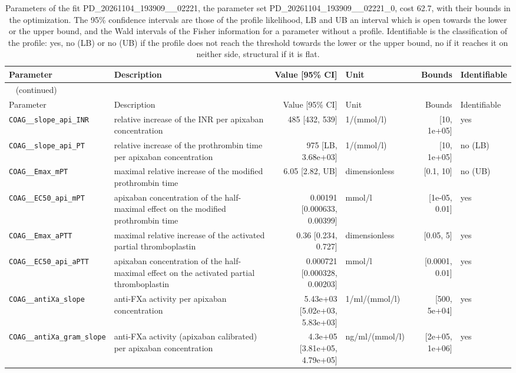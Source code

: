 \documentclass{article}
\begin{document}
\begin{longtable}{llrlrl}
\caption{Parameters of the fit PD\_20261104\_193909\_\_02221, the parameter set PD\_20261104\_193909\_\_02221\_0, cost 62.7, with their bounds in the optimization. The 95\% confidence intervals are those of the profile likelihood, LB and UB an interval which is open towards the lower or the upper bound, and the Wald intervals of the Fisher information for a parameter without a profile. Identifiable is the classification of the profile: yes, no (LB) or no (UB) if the profile does not reach the threshold towards the lower or the upper bound, no if it reaches it on neither side, structural if it is flat.}\label{tab:parameters:PD_20261104_193909__02221} \\
\toprule
Parameter & Description & Value [95\% CI] & Unit & Bounds & Identifiable \\
\midrule
\endfirsthead
\multicolumn{6}{l}{\small\tablename~\thetable{} (continued)} \\
\toprule
Parameter & Description & Value [95\% CI] & Unit & Bounds & Identifiable \\
\midrule
\endhead
\bottomrule
\endlastfoot
\texttt{COAG\_\_slope\_api\_INR} & relative increase of the INR per apixaban concentration & 485 [432, 539] & 1/(mmol/l) & [10, 1e+05] & yes \\
\texttt{COAG\_\_slope\_api\_PT} & relative increase of the prothrombin time per apixaban concentration & 975 [LB, 3.68e+03] & 1/(mmol/l) & [10, 1e+05] & no (LB) \\
\texttt{COAG\_\_Emax\_mPT} & maximal relative increase of the modified prothrombin time & 6.05 [2.82, UB] & dimensionless & [0.1, 10] & no (UB) \\
\texttt{COAG\_\_EC50\_api\_mPT} & apixaban concentration of the half-maximal effect on the modified prothrombin time & 0.00191 [0.000633, 0.00399] & mmol/l & [1e-05, 0.01] & yes \\
\texttt{COAG\_\_Emax\_aPTT} & maximal relative increase of the activated partial thromboplastin & 0.36 [0.234, 0.727] & dimensionless & [0.05, 5] & yes \\
\texttt{COAG\_\_EC50\_api\_aPTT} & apixaban concentration of the half-maximal effect on the activated partial thromboplastin & 0.000721 [0.000328, 0.00203] & mmol/l & [0.0001, 0.01] & yes \\
\texttt{COAG\_\_antiXa\_slope} & anti-FXa activity per apixaban concentration & 5.43e+03 [5.02e+03, 5.83e+03] & 1/ml/(mmol/l) & [500, 5e+04] & yes \\
\texttt{COAG\_\_antiXa\_gram\_slope} & anti-FXa activity (apixaban calibrated) per apixaban concentration & 4.3e+05 [3.81e+05, 4.79e+05] & ng/ml/(mmol/l) & [2e+05, 1e+06] & yes \\
\end{longtable}
\end{document}
